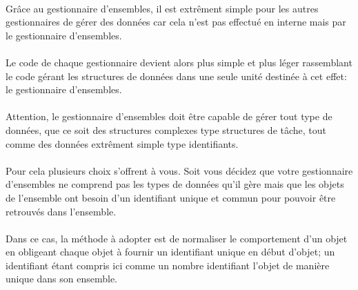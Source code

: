 \documentclass[10pt,a4wide]{article}
\begin{document}
\paragraph{}

Gr\^ace au gestionnaire d'ensembles, il est extr\^ement simple pour les
autres gestionnaires de g\'erer des donn\'ees car cela n'est pas effectu\'e
en interne mais par le gestionnaire d'ensembles.

\paragraph{}

Le code de chaque gestionnaire devient alors plus simple et plus l\'eger
rassemblant le code g\'erant les structures de donn\'ees dans une seule
unit\'e destin\'ee \`a cet effet: le gestionnaire d'ensembles.

\paragraph{}

Attention, le gestionnaire d'ensembles doit \^etre capable de g\'erer
tout type de donn\'ees, que ce soit des structures complexes type
structures de t\^ache, tout comme des donn\'ees extr\^ement simple
type identifiants.

\paragraph{}

Pour cela plusieurs choix s'offrent \`a vous. Soit vous d\'ecidez que votre
gestionnaire d'ensembles ne comprend pas les types de donn\'ees qu'il g\`ere
mais que les objets de l'ensemble ont besoin d'un identifiant unique et
commun pour pouvoir \^etre retrouv\'es dans l'ensemble.

\paragraph{}

Dans ce cas, la m\'ethode \`a adopter est de normaliser le comportement
d'un objet en obligeant chaque objet \`a fournir un identifiant unique
en d\'ebut d'objet; un identifiant \'etant compris ici comme un nombre
identifiant l'objet de mani\`ere unique dans son ensemble.

\paragraph{}
\end{document}
